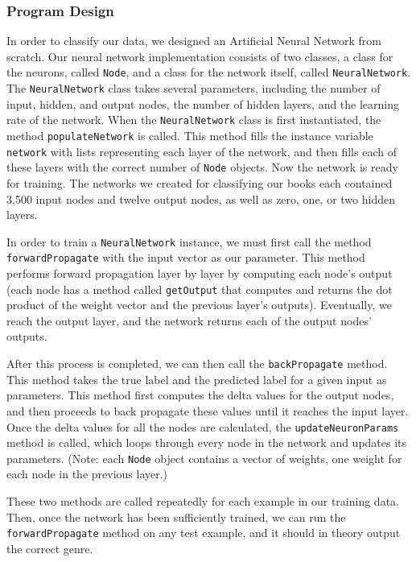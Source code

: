 \documentclass[11pt,letterpaper]{article}
\begin{document}
\subsubsection{Program Design}

In order to classify our data, we designed an Artificial Neural Network from scratch. Our neural network implementation consists of two classes, a class for the neurons, called \texttt{Node}, and a class for the network itself, called \texttt{NeuralNetwork}. The \texttt{NeuralNetwork} class takes several parameters, including the number of input, hidden, and output nodes, the number of hidden layers, and the learning rate of the network. When the \texttt{NeuralNetwork} class is first instantiated, the method \texttt{populateNetwork} is called. This method fills the instance variable \texttt{network} with lists representing each layer of the network, and then fills each of these layers with the correct number of \texttt{Node} objects. Now the network is ready for training. The networks we created for classifying our books each contained 3,500 input nodes and twelve output nodes, as well as zero, one, or two hidden layers.

In order to train a \texttt{NeuralNetwork} instance, we must first call the method \texttt{forwardPropagate} with the input vector as our parameter. This method performs forward propagation layer by layer by computing each node's output (each node has a method called \texttt{getOutput} that computes and returns the dot product of the weight vector and the previous layer's outputs). Eventually, we reach the output layer, and the network returns each of the output nodes' outputs.

After this process is completed, we can then call the \texttt{backPropagate} method. This method takes the true label and the predicted label for a given input as parameters. This method first computes the delta values for the output nodes, and then proceeds to back propagate these values until it reaches the input layer. Once the delta values for all the nodes are calculated, the \texttt{updateNeuronParams} method is called, which loops through every node in the network and updates its parameters. (Note: each \texttt{Node} object contains a vector of weights, one weight for each node in the previous layer.)

These two methods are called repeatedly for each example in our training data. Then, once the network has been sufficiently trained, we can run the \texttt{forwardPropagate} method on any test example, and it should in theory output the correct genre.
\end{document}
